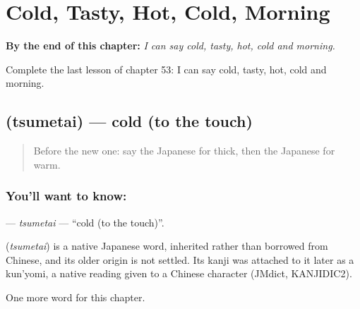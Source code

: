 
\chapter{Cold, Tasty, Hot, Cold, Morning}
\label{ch:ja-cold-tasty-hot-cold-morning}

\begin{chapteropening}
\textbf{By the end of this chapter:} \emph{I can say cold, tasty, hot, cold and morning.}

Complete the last lesson of chapter 53: I can say cold, tasty, hot, cold and morning.
\end{chapteropening}

\section[\texorpdfstring{\ja{つめたい} (tsumetai)}{つめたい (tsumetai)}]{ (tsumetai) — cold (to the touch)}

\label{lesson:JA-C53-tsumetai}



\begin{quote}
Before the new one: say the Japanese for thick, then the Japanese for warm.
\end{quote}

\subsection*{You'll want to know: }
\textbf{} — \emph{tsumetai} — \textquotedblleft{}cold (to the touch)\textquotedblright{}.

\begin{cousinweb}
\textbf{} (\emph{tsumetai}) is a native Japanese word, inherited rather than borrowed from Chinese, and its older origin is not settled. Its kanji was attached to it later as a kun'yomi, a native reading given to a Chinese character (JMdict, KANJIDIC2).
\end{cousinweb}

\begin{grammarlens}[title={What you've built}]
One more word for this chapter.
\end{grammarlens}

